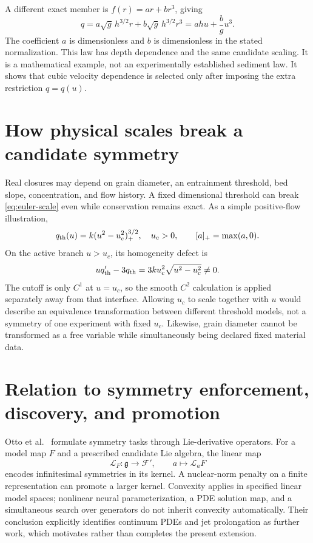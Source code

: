 \documentclass[11pt,a4paper,oneside]{report}
\numberwithin{equation}{chapter}
\begin{document}
A different exact member is $f(r)=ar+br^3$, giving
\begin{equation}\label{eq:example-family}
q=a\sqrt g\,h^{3/2}r+b\sqrt g\,h^{3/2}r^3
=ahu+\frac b g u^3.
\end{equation}
The coefficient $a$ is dimensionless and $b$ is dimensionless in the stated normalization. This law has depth dependence and the same candidate scaling. It is a mathematical example, not an experimentally established sediment law. It shows that cubic velocity dependence is selected only after imposing the extra restriction $q=q(u)$.



\section{How physical scales break a candidate symmetry}
Real closures may depend on grain diameter, an entrainment threshold, bed slope, concentration, and flow history. A fixed dimensional threshold can break \eqref{eq:euler-scale} even while conservation remains exact. As a simple positive-flow illustration,
\begin{equation}\label{eq:threshold}
q_{\rm th}(u)=k(u^2-u_c^2)_+^{3/2},\quad u_c>0,
\qquad [a]_+=\max(a,0).
\end{equation}
On the active branch $u>u_c$, its homogeneity defect is
\begin{equation}
uq_{\rm th}'-3q_{\rm th}=3ku_c^2\sqrt{u^2-u_c^2}\ne0.
\end{equation}
The cutoff is only $C^1$ at $u=u_c$, so the smooth $C^2$ calculation is applied separately away from that interface. Allowing $u_c$ to scale together with $u$ would describe an equivalence transformation between different threshold models, not a symmetry of one experiment with fixed $u_c$. Likewise, grain diameter cannot be transformed as a free variable while simultaneously being declared fixed material data.

\section{Relation to symmetry enforcement, discovery, and promotion}
Otto et al.\ \cite{otto} formulate symmetry tasks through Lie-derivative operators. For a model map $F$ and a prescribed candidate Lie algebra, the linear map
\begin{equation}
\mathcal L_F:\mathfrak g\to\mathcal F',\qquad a\mapsto\mathcal L_aF
\end{equation}
encodes infinitesimal symmetries in its kernel. A nuclear-norm penalty on a finite representation can promote a larger kernel. Convexity applies in specified linear model spaces; nonlinear neural parameterization, a PDE solution map, and a simultaneous search over generators do not inherit convexity automatically. Their conclusion explicitly identifies continuum PDEs and jet prolongation as further work, which motivates rather than completes the present extension.
\end{document}
